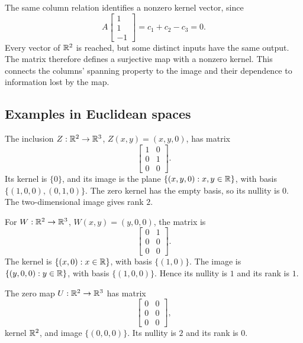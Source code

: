 \begin{example}
  The same column relation identifies a nonzero kernel vector, since
  \[
    A\begin{bmatrix}1\\1\\-1\end{bmatrix}=c_1+c_2-c_3=0.
  \]
  Every vector of \(\mathbb{R}^2\) is reached, but some distinct inputs have
  the same output. The matrix therefore defines a surjective map with
  a nonzero kernel. This connects the columns' spanning property to
  the image and their dependence to information lost by the map.
\end{example}

\subsection{Examples in Euclidean spaces}

\begin{example}
  The inclusion \(Z:\mathbb{R}^2\to\mathbb{R}^3\), \(Z(x,y)=(x,y,0)\), has matrix
  \[
    \begin{bmatrix}1&0\\0&1\\0&0\end{bmatrix}.
  \]
  Its kernel is \(\{0\}\), and its image is the plane
  \(\{(x,y,0):x,y\in\mathbb{R}\}\), with basis
  \(\{(1,0,0),(0,1,0)\}\). The zero kernel has the empty basis, so
  its nullity is \(0\). The two-dimensional image gives rank \(2\).
\end{example}

\begin{example}
  For \(W:\mathbb{R}^2\to\mathbb{R}^3\), \(W(x,y)=(y,0,0)\), the matrix is
  \[
    \begin{bmatrix}0&1\\0&0\\0&0\end{bmatrix}.
  \]
  The kernel is \(\{(x,0):x\in\mathbb{R}\}\), with basis \(\{(1,0)\}\).
  The image is \(\{(y,0,0):y\in\mathbb{R}\}\), with basis \(\{(1,0,0)\}\).
  Hence its nullity is \(1\) and its rank is \(1\).
\end{example}

\begin{example}
  The zero map \(U:\mathbb{R}^2\to\mathbb{R}^3\) has matrix
  \[
    \begin{bmatrix}0&0\\0&0\\0&0\end{bmatrix},
  \]
  kernel \(\mathbb{R}^2\), and image \(\{(0,0,0)\}\). Its nullity is \(2\)
  and its rank is \(0\).
\end{example}

